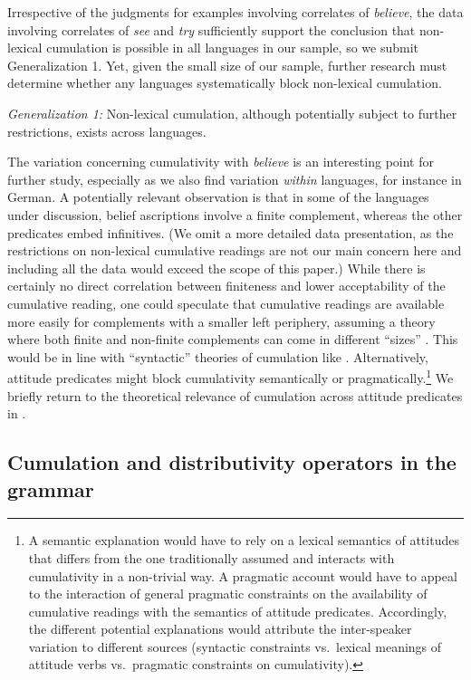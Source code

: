 \documentclass[output=paper]{langscibook}
\begin{document}
Irrespective of the judgments for examples involving correlates of \textit{believe}, the data involving correlates of \textit{see} and \textit{try} sufficiently support the conclusion that non-lexical cumulation is possible in all languages in our sample, so we submit Generalization 1. Yet, given the small size of our sample, further research must determine whether any languages systematically block non-lexical cumulation.

\ea \textit{Generalization 1:} Non-lexical cumulation, although potentially subject to further restrictions, exists across languages. \z

\noindent The variation concerning cumulativity with \textit{believe} is an interesting point for further study, especially as we also find variation \textit{within} languages, for instance in German. A potentially relevant observation is that in some of the languages under discussion, belief ascriptions involve a finite complement, whereas the other predicates embed infinitives. (We omit a more detailed  data presentation, as the restrictions on non-lexical cumulative readings are not our main concern here and including all the data would exceed the scope of this paper.) While there is certainly no direct correlation between finiteness and lower acceptability of the cumulative reading, one could speculate that cumulative readings are available more easily for complements with a smaller left periphery, assuming a theory where both finite and non-finite complements can come in different ``sizes'' \citep{Wurmbrand:2015,Todorovic:2020}. This would be in line with ``syntactic'' theories of cumulation like \citet{Beck:2000a}. Alternatively, attitude predicates might block cumulativity semantically or pragmatically.\footnote{A semantic explanation would have to rely on a lexical semantics of attitudes that differs from the one traditionally assumed and interacts with cumulativity in a non-trivial way. A pragmatic account would have to appeal to the interaction of  general pragmatic constraints on the availability of cumulative readings with the semantics of attitude predicates. Accordingly, the different potential explanations would attribute the inter-speaker variation to different sources (syntactic constraints vs.~lexical meanings of attitude verbs vs.~pragmatic constraints on cumulativity).} We briefly return to the theoretical relevance of cumulation across attitude predicates in .

\subsection{Cumulation and distributivity operators in the grammar}\label{has-sch:sec:3.2}
\end{document}
